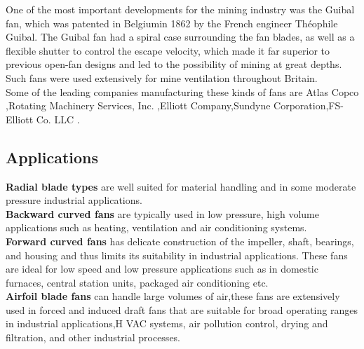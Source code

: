 \documentclass[11pt]{article}
\begin{document}
One of the most important developments for the mining industry was the Guibal fan, which was patented in Belgiumin 1862 by the French engineer Théophile Guibal. The Guibal fan had a spiral case surrounding the fan blades, as well as a flexible shutter to control the escape velocity, which made it far superior to previous open-fan designs and led to the possibility of mining at great depths. Such fans were used extensively for mine ventilation throughout Britain.\\
Some of the leading companies manufacturing these kinds of fans are Atlas Copco ,Rotating Machinery Services, Inc. ,Elliott Company,Sundyne Corporation,FS-Elliott Co. LLC .
 \subsection{Applications}
 \textbf{Radial blade types} are well suited for material handling and in some moderate pressure industrial applications.\\
 \textbf{Backward curved fans} are typically used in low pressure, high volume applications such as heating, ventilation and air conditioning systems.\\
 \textbf{ Forward curved fans} has delicate construction of the impeller, shaft, bearings, and housing and thus limits its suitability in industrial applications. These fans are ideal for low speed and low pressure applications such as in domestic furnaces, central station units, packaged air conditioning etc.\\
 \textbf{Airfoil blade fans} can handle large volumes of air,these fans are extensively used in forced and induced draft fans that are suitable for broad operating ranges in industrial applications,H VAC systems, air pollution control, drying  and filtration, and other industrial processes.
\end{document}
